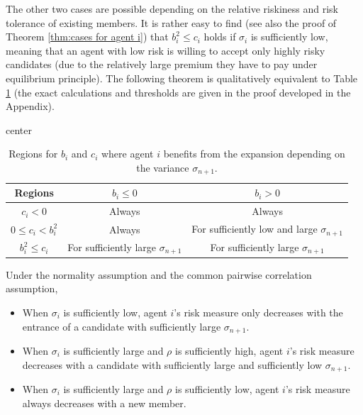 \documentclass[fleqn,mnsc,nonblindrev]{informs4}
\begin{document}
The other two cases are possible depending on the relative riskiness and risk tolerance of existing members. It is rather easy to find (see also the proof of Theorem \ref{thm:cases for agent i}) that $b_i^2\leq c_i$ holds if $\sigma_i$ is sufficiently low, meaning that an agent with low risk is willing to accept only highly risky candidates (due to the relatively large premium they have to pay under equilibrium principle). The following theorem is qualitatively equivalent to Table \ref{tab:table1} (the exact calculations and thresholds are given in the proof developed in the Appendix). 

\begin{table}[t]
\caption{Regions for $b_i$ and $c_i$ where agent $i$ benefits from the expansion depending on the variance $\sigma_{n+1}$.}
\small
\begin{adjustbox}{center}
\begin{tabular}{|c||c|c|}
\hline
Regions & $b_i\leq0$ & $b_i> 0$\\ \hline\hline
$c_i<0$& Always & Always\\ \hline
$0\leq c_i<b_i^2 $& Always& For sufficiently low and large $\sigma_{n+1}$            \\ \hline 
$b_i^2\leq c_i $ & For sufficiently large $\sigma_{n+1}$ & For sufficiently large $\sigma_{n+1}$ \\ \hline
\end{tabular}
\end{adjustbox}
\label{tab:table1}
\end{table}

\begin{theorem}\label{thm:cases for agent i}
Under the normality assumption and the common pairwise correlation assumption,
\begin{itemize}
\item[i.] When $\sigma_i$ is sufficiently low,  agent $i$'s risk measure only decreases with the entrance of a candidate with sufficiently large $\sigma_{n+1}$.

\item[ii.] When $\sigma_i$ is sufficiently large and  $\rho$ is sufficiently high, 
agent $i$'s risk measure decreases with a candidate with sufficiently large and sufficiently low $\sigma_{n+1}$.

\item[iii.] When $\sigma_i$ is sufficiently large and $\rho$ is sufficiently low, agent $i$'s risk measure always decreases with a new member.
\end{itemize}
\end{theorem}
\end{document}
